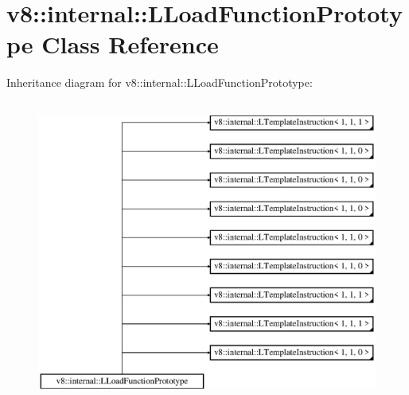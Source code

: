 \hypertarget{classv8_1_1internal_1_1_l_load_function_prototype}{}\section{v8\+:\+:internal\+:\+:L\+Load\+Function\+Prototype Class Reference}
\label{classv8_1_1internal_1_1_l_load_function_prototype}
Inheritance diagram for v8\+:\+:internal\+:\+:L\+Load\+Function\+Prototype\+:\begin{figure}[H]
\begin{center}
\leavevmode
\includegraphics[height=10.000000cm]{classv8_1_1internal_1_1_l_load_function_prototype}
\end{center}
\end{figure}
